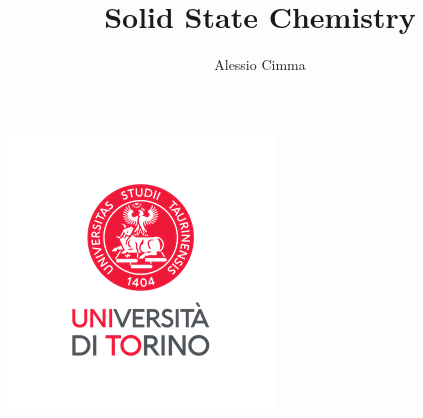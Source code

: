 \documentclass{article}
\title{Solid State Chemistry}
\author{Alessio Cimma}
\begin{document}
\maketitle

\begin{center}
	\includegraphics*[width=0.22\linewidth]{../images/logo.png}
\end{center}

\tableofcontents
\newpage
















% 










\end{document}
